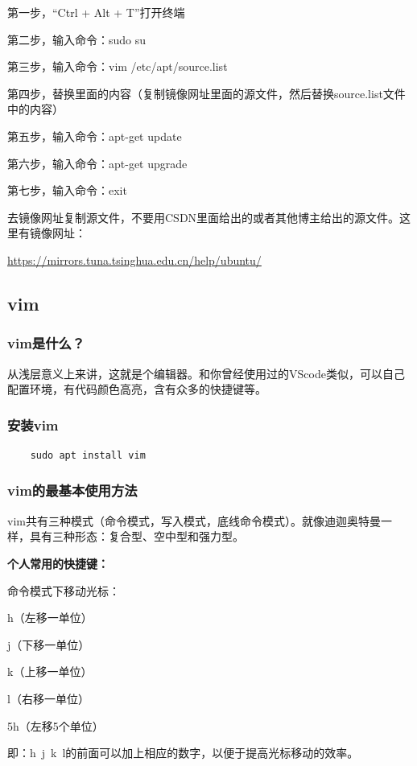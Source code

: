\documentclass[12pt]{article}
\begin{document}
第一步，“Ctrl + Alt + T”打开终端

第二步，输入命令：sudo su

第三步，输入命令：vim /etc/apt/source.list

第四步，替换里面的内容（复制镜像网址里面的源文件，然后替换source.list文件中的内容）

第五步，输入命令：apt-get update

第六步，输入命令：apt-get upgrade

第七步，输入命令：exit


去镜像网址复制源文件，不要用CSDN里面给出的或者其他博主给出的源文件。这里有镜像网址：

\href{https://mirrors.tuna.tsinghua.edu.cn/help/ubuntu/}{https://mirrors.tuna.tsinghua.edu.cn/help/ubuntu/}

\subsection{vim}

\subsubsection{vim是什么？}
从浅层意义上来讲，这就是个编辑器。和你曾经使用过的VScode类似，可以自己配置环境，有代码颜色高亮，含有众多的快捷键等。
\subsubsection{安装vim}
\begin{verbatim}
    sudo apt install vim
\end{verbatim}


\subsubsection{vim的最基本使用方法}
vim共有三种模式（命令模式，写入模式，底线命令模式）。就像迪迦奥特曼一样，具有三种形态：复合型、空中型和强力型。


\noindent \textbf{个人常用的快捷键：}

命令模式下移动光标：

h（左移一单位）

j（下移一单位）

k（上移一单位）

l（右移一单位）

5h（左移5个单位）

即：h~j~k~l的前面可以加上相应的数字，以便于提高光标移动的效率。
\end{document}
